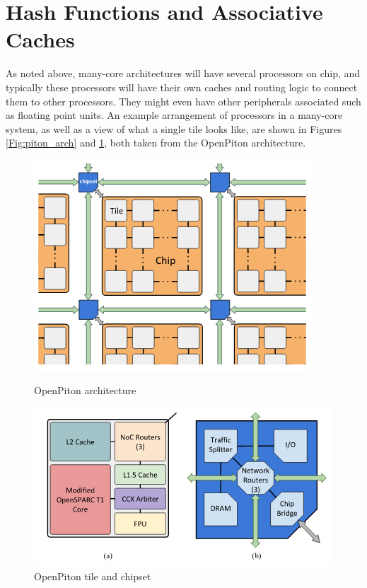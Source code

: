 \section{Hash Functions and Associative Caches}
\label{sec:Problem}

As noted above, many-core architectures will have several processors on chip,
and typically these processors will have their own caches and routing logic to
connect them to other processors.  They might even have other peripherals
associated such as floating point units.  An example arrangement of processors
in a many-core system, as well as a view of what a single tile looks like, are
shown in Figures \ref{Fig:piton_arch} and \ref{Fig:piton_tile}, both taken from the
OpenPiton architecture.

\begin{figure}[h]
  \centering
  \begin{minipage}[b]{0.4\textwidth}
    \includegraphics[width=\textwidth]{piton_arch.png}
    \caption{OpenPiton architecture}
    \label{Fig:piton_arch}
  \end{minipage}
  \hfill
  \begin{minipage}[b]{0.4\textwidth}
    \includegraphics[width=\textwidth]{piton_tile_and_chipset.png}
    \caption{OpenPiton tile and chipset}
    \label{Fig:piton_tile}
  \end{minipage}
\end{figure}


